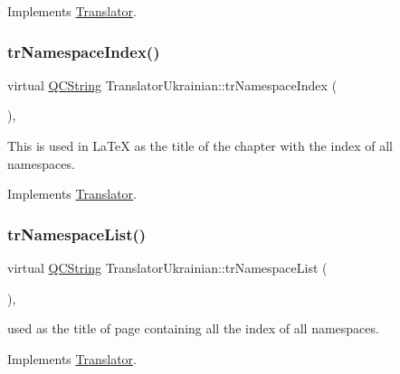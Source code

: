 Implements \mbox{\hyperlink{class_translator}{Translator}}.

\mbox{\label{class_translator_ukrainian_a791c41014047ba242e9a1f5fd2de6de9}} 
\subsubsection{\texorpdfstring{trNamespaceIndex()}{trNamespaceIndex()}}
{\footnotesize\ttfamily virtual \mbox{\hyperlink{class_q_c_string}{Q\+C\+String}} Translator\+Ukrainian\+::tr\+Namespace\+Index (\begin{DoxyParamCaption}{ }\end{DoxyParamCaption})\hspace{0.3cm}{\ttfamily [inline]}, {\ttfamily [virtual]}}

This is used in La\+TeX as the title of the chapter with the index of all namespaces. 

Implements \mbox{\hyperlink{class_translator}{Translator}}.

\mbox{\label{class_translator_ukrainian_a648279e7b00550a41d5ad2220cef8e47}} 
\subsubsection{\texorpdfstring{trNamespaceList()}{trNamespaceList()}}
{\footnotesize\ttfamily virtual \mbox{\hyperlink{class_q_c_string}{Q\+C\+String}} Translator\+Ukrainian\+::tr\+Namespace\+List (\begin{DoxyParamCaption}{ }\end{DoxyParamCaption})\hspace{0.3cm}{\ttfamily [inline]}, {\ttfamily [virtual]}}

used as the title of page containing all the index of all namespaces. 

Implements \mbox{\hyperlink{class_translator}{Translator}}.

\mbox{\label{class_translator_ukrainian_a04283b3178d3f155675de559d98937c0}} 
